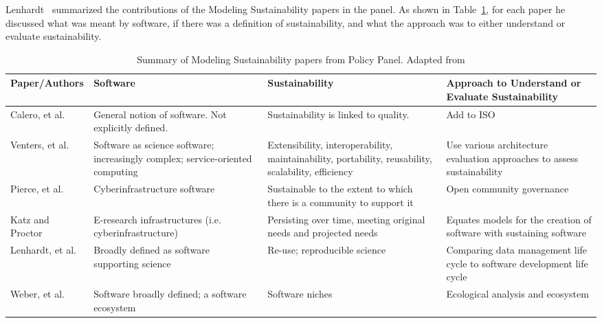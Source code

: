 \documentclass[11pt, oneside]{amsart}
\begin{document}
Lenhardt~\cite{lenhardt-wssspe1-panel} summarized the contributions of the Modeling
Sustainability papers in the panel.
As shown in Table~\ref{tab:defining-sustainability}, for each paper he
discussed what was meant by software, if there was a definition of sustainability, and
what the approach was to either understand or evaluate sustainability.

\begin{table}[h]
  \begin{scriptsize}
    \begin{center}
      \caption{Summary of Modeling Sustainability papers from Policy Panel.  Adapted from \cite{lenhardt-wssspe1-panel}}
      \label{tab:defining-sustainability}
      \begin{tabular}{|p{2.3cm}|p{3.6cm}|p{4.4cm}|p{4.8cm}|}
                \hline
{\bf Paper/Authors}
& {\bf Software}
& {\bf Sustainability}
& {\bf Approach to Understand or Evaluate Sustainability} \\
                \hline
Calero, et al. \cite{Calero_WSSSPE}
& General notion of software. Not explicitly defined.
& Sustainability is linked to quality.
& Add to ISO \\
                \hline
Venters, et al. \cite{Venters_WSSSPE}
& Software as science software; increasingly complex; service-oriented computing
& Extensibility, interoperability, maintainability, portability, reusability, scalability, efficiency
& Use various architecture evaluation approaches to assess sustainability \\
                \hline
Pierce, et al. \cite{Pierce_WSSSPE}
& Cyberinfrastructure software
& Sustainable to the extent to which there is a community to support it
& Open community governance \\
                \hline
Katz and Proctor \cite{Katz_WSSSPE}
& E-research infrastructures (i.e. cyberinfrastructure)
& Persisting over time, meeting original needs and projected needs
& Equates models for the creation of software with sustaining software \\
                \hline
Lenhardt, et al. \cite{Lenhardt_WSSSPE}
& Broadly defined as software supporting science
& Re-use; reproducible science
& Comparing data management life cycle to software development life cycle \\
                \hline
Weber, et al. \cite{Weber_WSSSPE}
& Software broadly defined; a software ecosystem
& Software niches
& Ecological analysis and ecosystem \\
                \hline
     \end{tabular}
    \end{center}
  \end{scriptsize}
\end{table}
\end{document}
